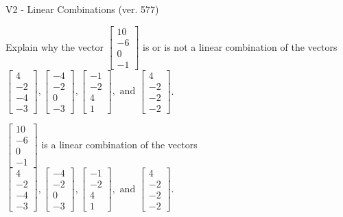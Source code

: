 \begin{exercise}
  \begin{exerciseTitle}V2 - Linear Combinations (ver. 577)\end{exerciseTitle}
  \begin{exerciseStatement}
    Explain why the vector \(\left[\begin{array}{c}
10 \\
-6 \\
0 \\
-1
\end{array}\right]\)  is or is not a linear 
	combination of the vectors \(\left[\begin{array}{c}
4 \\
-2 \\
-4 \\
-3
\end{array}\right] , \left[\begin{array}{c}
-4 \\
-2 \\
0 \\
-3
\end{array}\right] , \left[\begin{array}{c}
-1 \\
-2 \\
4 \\
1
\end{array}\right] , \text{ and } \left[\begin{array}{c}
4 \\
-2 \\
-2 \\
-2
\end{array}\right]\).
	


  \end{exerciseStatement}
  \begin{exerciseAnswer}
   \(\left[\begin{array}{c}
10 \\
-6 \\
0 \\
-1
\end{array}\right]\) 
  	 is  
	a linear combination of the vectors \(\left[\begin{array}{c}
4 \\
-2 \\
-4 \\
-3
\end{array}\right] , \left[\begin{array}{c}
-4 \\
-2 \\
0 \\
-3
\end{array}\right] , \left[\begin{array}{c}
-1 \\
-2 \\
4 \\
1
\end{array}\right] , \text{ and } \left[\begin{array}{c}
4 \\
-2 \\
-2 \\
-2
\end{array}\right]\).


\end{exerciseAnswer}
\end{exercise}
